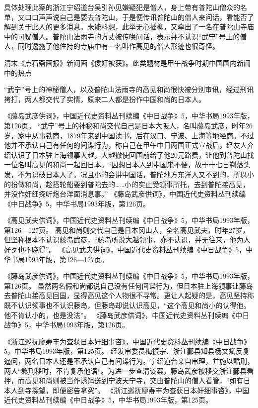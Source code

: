 \documentclass[12pt,UTF8]{ctexbook}
\begin{document}
具体处理此案的浙江宁绍道台吴引孙见嫌疑犯是僧人，身上带有普陀山僧众的名单，又口口声声说自己是要去普陀山，于是便传讯普陀山的僧人来问话，看能否了解到关于此人的更多消息。未能料想，此举无心插柳，又牵出了一名在普陀山寺庙中的可疑僧人。普陀山法雨寺的方丈被传唤问话，表示并不认识“武宁”号上的僧人，同时透露了他住持的寺庙中有一名叫作高见的僧人形迹也很奇怪。


清末《点石斋画报》新闻画《倭奸被获》。此类题材是甲午战争时期中国国内新闻中的热点

“武宁”号上的神秘僧人，以及普陀山法雨寺的高见和尚很快被分别审讯，经过刑讯拷打，两人都交代了实情，原来二人都是扮作中国和尚的日本人。

《藤岛武彦供词》，中国近代史资料丛刊续编《中日战争》5，中华书局1993年版，第126页。
“武宁”号上的神秘和尚交代自己是日本大阪人，名叫藤岛武彦，时年26岁，家中从事铁商，1879年来到中国读书，后在汉口、宁波、上海等地经商。不过他并不承认自己有任何的间谍行为，称自己在甲午中日两国正式宣战后，经友人介绍认识了日本驻上海领事大越，大越撤使回国前给了他20元路费，让他到普陀山找一位名叫高见的和尚一起回日本。“因想日本人到中国来不便，故于十七日剃落头发，不为识破日本人了。况且小的会讲中国话，普陀地方东洋人又不到的，所以小的扮做和尚，趁搭轮船要到普陀去的……小的实止受领事所托，去到普陀接高见，并没作奸细探听炮台洋面消息事。” 《藤岛武彦供词》，中国近代史资料丛刊续编《中日战争》5，中华书局1993年版，第126页。

《高见武夫供词》，中国近代史资料丛刊续编《中日战争》5，中华书局1993年版，第126—127页。
高见和尚则交代自己是日本冈山人，全名高见武夫，时年27岁，但坚称根本不认识藤岛武彦，“藤岛所说大越领事，亦不认识，并无往来，他为人好歹也不晓得”。 《高见武夫供词》，中国近代史资料丛刊续编《中日战争》5，中华书局1993年版，第126—127页。

《藤岛武彦供词》，中国近代史资料丛刊续编《中日战争》5，中华书局1993年版，第126页。
虽然两名假和尚都说自己没有任何间谍行为，但日本驻上海领事让藤岛去普陀山接高见回国，显得高见这个人物很不寻常。更让人起疑的是，高见坚持称既不认识领事也不认识藤岛，但藤岛却说认识高见，“这个高见和尚小的认得他。他不肯认小的，也是没法”。 《藤岛武彦供词》，中国近代史资料丛刊续编《中日战争》5，中华书局1993年版，第126页。

《浙江巡抚廖寿丰为查获日本奸细事咨》，中国近代史资料丛刊续编《中日战争》5，中华书局1993年版，第125页。
经发审委员梅振宗、浙江鄞县知县杨文斌反复逼问，两名日本人还是不承认自己有间谍行为。宁绍道台亲自审理，并施以酷刑，两人“熬刑移时，不肯复承他语”。为进一步查清该案，藤岛武彦被移交浙江鄞县看押，而高见和尚则被当作诱饵送到宁波天宁寺，交由普陀山的僧人看管，“如有日本人到寺探望，即便密告拿究”。 《浙江巡抚廖寿丰为查获日本奸细事咨》，中国近代史资料丛刊续编《中日战争》5，中华书局1993年版，第125页。
\end{document}
